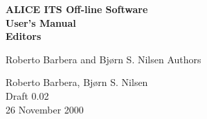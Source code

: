 \documentclass{report}
\begin{document}
\begin{center}
\huge\bf ALICE ITS Off-line Software 
\\[0.25cm]
\huge\bf User's Manual
\\[1cm]
\normalsize
Editors

Roberto Barbera and Bj\o rn S. Nilsen
\vskip 20pt
Authors

Roberto Barbera, Bj\o rn S. Nilsen
\\[1cm]
Draft 0.02\\
26 November 2000

\end{center}
\tableofcontents

%












\end{document}

